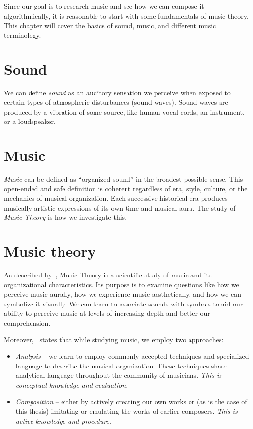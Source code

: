 
\begin{chapterabstract}
    Since our goal is to research music and see how we can compose it algorithmically, it is reasonable to start with some fundamentals of music theory.
    This chapter will cover the basics of sound, music, and different music terminology.
\end{chapterabstract}


\section{Sound}\label{sec:sound}

We can define \textit{sound} as an auditory sensation we perceive when exposed to certain types of atmospheric disturbances (sound waves).
Sound waves are produced by a vibration of some source, like human vocal cords, an instrument, or a loudspeaker.~\cite{sound}


\section{Music}\label{sec:music}

\textit{Music} can be defined as ``organized sound'' in the broadest possible sense.
This open-ended and safe definition is coherent regardless of era, style, culture, or the mechanics of musical organization.
Each successive historical era produces musically artistic expressions of its own time and musical aura.
The study of \textit{Music Theory} is how we investigate this.~\cite{music-theory-andrew}


\section{Music theory}\label{sec:music-theory}

As described by~\cite{music-theory-andrew}, Music Theory is a scientific study of music and its organizational characteristics.
Its purpose is to examine questions like how we perceive music aurally, how we experience music aesthetically, and how we can symbolize it visually.
We can learn to associate sounds with symbols to aid our ability to perceive music at levels of increasing depth and better our comprehension.

Moreover,~\cite{music-theory-andrew} states that while studying music, we employ two approaches:
\begin{itemize}
    \item \textit{Analysis} -- we learn to employ commonly accepted techniques and specialized language to describe the musical organization.
    These techniques share analytical language throughout the community of musicians.
    \textit{This is conceptual knowledge and evaluation.}
    \item \textit{Composition} -- either by actively creating our own works or (as is the case of this thesis) imitating or emulating the works of earlier composers.
    \textit{This is active knowledge and procedure.}
\end{itemize}


